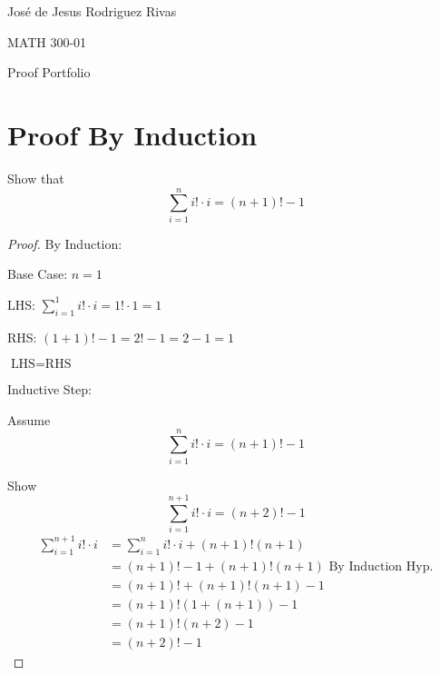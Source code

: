 \documentclass[12pt]{article}
\begin{document}
José de Jesus Rodriguez Rivas

MATH 300-01

\newcommand{\contradiction}{\Rightarrow\Leftarrow}

\begin{center}
Proof Portfolio
\end{center}
\section{Proof By Induction}

Show that
$$\sum_{i = 1}^{n} i! \cdot i = (n + 1)! - 1$$

\begin{proof}
By Induction:

Base Case: $n = 1$

LHS: $\sum_{i=1}^{1} i! \cdot i = 1! \cdot 1 = 1$

RHS: $(1 +1)! - 1 = 2! - 1 = 2 - 1 = 1$

$\text{LHS} = \text{RHS}$

Inductive Step: 

Assume 
$$\sum_{i = 1}^{n} i! \cdot i = (n + 1)! - 1$$

Show 
$$\sum_{i = 1}^{n+1} i! \cdot i = (n + 2)! - 1$$
\begin{align*}
\sum_{i = 1}^{n+1} i! \cdot i &= \sum_{i = 1}^{n} i! \cdot i + (n + 1)! (n+1)\\
&= (n+1)!-1 + (n + 1)!(n+1)\text{ By Induction Hyp.}\\
&= (n+1)! + (n+1)!(n+1)-1\\
&= (n+1)!(1 + (n+1)) - 1\\
&= (n+1)!(n+2)-1\\
&= (n+2)! - 1
\end{align*}
\end{proof}
\end{document}
